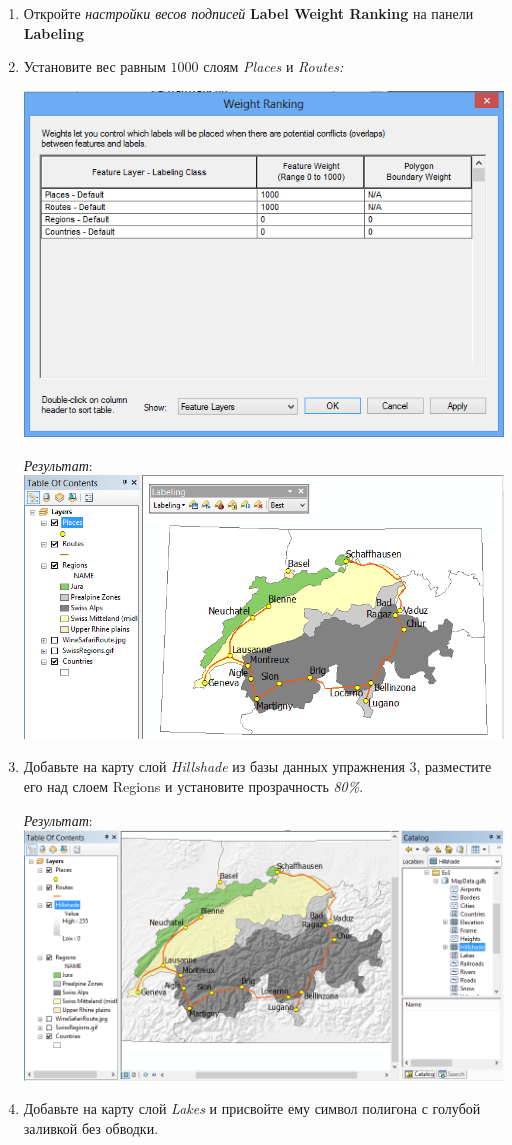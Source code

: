 \documentclass[]{book}
\theoremstyle{definition}
\theoremstyle{definition}
\theoremstyle{definition}
\theoremstyle{remark}
\begin{document}
\begin{enumerate}
\def\labelenumi{\arabic{enumi}.}
\item
  Откройте \emph{настройки весов подписей} \textbf{Label Weight Ranking}
  на панели \textbf{Labeling}
\item
  Установите вес равным \(1000\) слоям \emph{Places} и \emph{Routes:}

  \includegraphics{images/Ex07/image33.png}

  \emph{Результат}: \includegraphics{images/Ex07/image34.png}
\item
  Добавьте на карту слой \emph{Hillshade} из базы данных упражнения 3,
  разместите его над слоем Regions и установите прозрачность
  \emph{80\%}.

  \emph{Результат}: \includegraphics{images/Ex07/image35.png}
\item
  Добавьте на карту слой \emph{Lakes} и присвойте ему символ полигона с
  голубой заливкой без обводки.


\end{enumerate}
\end{document}

